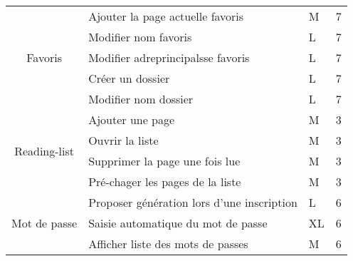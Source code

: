 \documentclass[10pt,a4paper]{article}
\begin{document}
\begin{table}[H]
\begin{tabular}{|c|l|l|l|}
\multirow{5}{*}{Favoris}                & Ajouter la page actuelle favoris             & M                                            & 7                                           \\ \cline{2-4} 
                                        & Modifier nom favoris                         & L                                            & 7                                           \\ \cline{2-4} 
                                        & Modifier adreprincipalsse favoris                     & L                                            & 7                                           \\ \cline{2-4} 
                                        & Créer un dossier                             & L                                            & 7                                           \\ \cline{2-4} 
                                        & Modifier nom dossier                         & L                                            & 7                                           \\ \hline
\multirow{4}{*}{Reading-list}           & Ajouter une page                             & M                                            & 3                                           \\ \cline{2-4} 
                                        & Ouvrir la liste                              & M                                            & 3                                           \\ \cline{2-4} 
                                        & Supprimer la page une fois lue               & M                                            & 3                                           \\ \cline{2-4} 
                                        & Pré-chager les pages de la liste             & M                                            & 3                                           \\ \hline
\multirow{4}{*}{Mot de passe}           & Proposer génération lors d'une inscription   & L                                            & 6                                           \\ \cline{2-4} 
                                        & Saisie automatique du mot de passe           & XL                                           & 6                                           \\ \cline{2-4} 
                                        & Afficher liste des mots de passes            & M                                            & 6                                           \\ \cline{2-4} 

\end{tabular}
\end{table}
\end{document}
